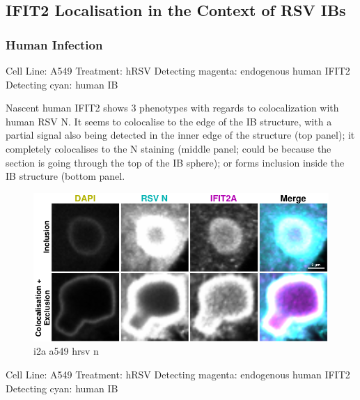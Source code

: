 \subsection{IFIT2 Localisation in the Context of RSV IBs} \label{subsec:IFIT2 Localisation in the Context of RSV IBs}
\subsubsection{Human Infection}
Cell Line: A549 \newline
Treatment: hRSV \newline
Detecting magenta: endogenous human IFIT2  \newline
Detecting cyan: human IB \newline

Nascent human IFIT2 shows 3 phenotypes with regards to colocalization with human RSV N. It seems to colocalise to the edge of the IB structure, with a partial signal also being detected in the inner edge of the structure (top panel); it completely colocalises to the N staining (middle panel; could be because the section is going through the top of the IB sphere); or forms inclusion inside the IB structure (bottom panel. 

\begin{figure}
    \centering
    \includegraphics[width=1\linewidth]{10. Chapter 5/Figs/01. Infection/01. i2a a549 hrsv n.pdf}
    \caption[i2a a549 hrsv n]{i2a a549 hrsv n}
    \label{fig:i2a a549 hrsv n}
\end{figure}

Cell Line: A549 \newline
Treatment: hRSV \newline
Detecting magenta: endogenous human IFIT2  \newline
Detecting cyan: human IB \newline

